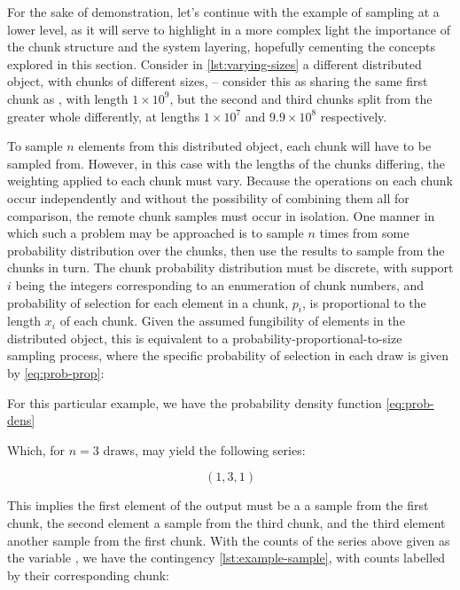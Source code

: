 For the sake of demonstration, let's continue with the example of
sampling at a lower level, as it will serve to highlight in a more
complex light the importance of the chunk structure and the system
layering, hopefully cementing the concepts explored in this section.
Consider in \cref{lst:varying-sizes} a different distributed object, with chunks of different sizes,
 -- consider this as sharing the same first chunk as
, with length \(1 \times 10^9\), but the second and third
chunks split from the greater whole differently, at lengths
\(1 \times 10^7\) and \(9.9 \times 10^8\) respectively.


To sample \(n\) elements from this distributed object, each chunk will
have to be sampled from. However, in this case with the lengths of the
chunks differing, the weighting applied to each chunk must vary. Because
the operations on each chunk occur independently and without the
possibility of combining them all for comparison, the remote chunk
samples must occur in isolation. One manner in which such a problem may
be approached is to sample \(n\) times from some probability
distribution over the chunks, then use the results to sample from the
chunks in turn. The chunk probability distribution must be discrete,
with support \(i\) being the integers corresponding to an enumeration of
chunk numbers, and probability of selection for each element in a chunk,
\(p_i\), is proportional to the length \(x_i\) of each chunk. Given the
assumed fungibility of elements in the distributed object, this is
equivalent to a probability-proportional-to-size sampling process, where
the specific probability of selection in each draw is given by \cref{eq:prob-prop}:


For this particular example, we have the probability density
function \cref{eq:prob-dens}




Which, for \(n=3\) draws, may yield the following series:

\[
    (1, 3, 1)
\]

This implies the first element of the output must be a a sample from the
first chunk, the second element a sample from the third chunk, and the
third element another sample from the first chunk. With the counts of
the series above given as the variable , we have
the contingency \cref{lst:example-sample}, with counts labelled by their
corresponding chunk:

